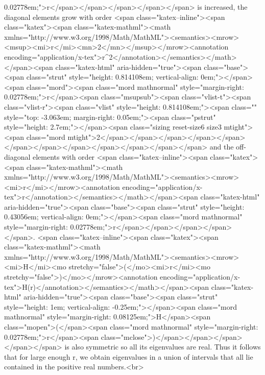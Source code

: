 0.02778em;">r</span></span></span></span></span> is increased, the diagonal elements grow with order <span class="katex--inline"><span class="katex"><span class="katex-mathml"><math xmlns="http://www.w3.org/1998/Math/MathML"><semantics><mrow><msup><mi>r</mi><mn>2</mn></msup></mrow><annotation encoding="application/x-tex">r^2</annotation></semantics></math></span><span class="katex-html" aria-hidden="true"><span class="base"><span class="strut" style="height: 0.814108em; vertical-align: 0em;"></span><span class="mord"><span class="mord mathnormal" style="margin-right: 0.02778em;">r</span><span class="msupsub"><span class="vlist-t"><span class="vlist-r"><span class="vlist" style="height: 0.814108em;"><span class="" style="top: -3.063em; margin-right: 0.05em;"><span class="pstrut" style="height: 2.7em;"></span><span class="sizing reset-size6 size3 mtight"><span class="mord mtight">2</span></span></span></span></span></span></span></span></span></span></span></span> and the off-diagonal elements with order <span class="katex--inline"><span class="katex"><span class="katex-mathml"><math xmlns="http://www.w3.org/1998/Math/MathML"><semantics><mrow><mi>r</mi></mrow><annotation encoding="application/x-tex">r</annotation></semantics></math></span><span class="katex-html" aria-hidden="true"><span class="base"><span class="strut" style="height: 0.43056em; vertical-align: 0em;"></span><span class="mord mathnormal" style="margin-right: 0.02778em;">r</span></span></span></span></span>. <span class="katex--inline"><span class="katex"><span class="katex-mathml"><math xmlns="http://www.w3.org/1998/Math/MathML"><semantics><mrow><mi>H</mi><mo stretchy="false">(</mo><mi>r</mi><mo stretchy="false">)</mo></mrow><annotation encoding="application/x-tex">H(r)</annotation></semantics></math></span><span class="katex-html" aria-hidden="true"><span class="base"><span class="strut" style="height: 1em; vertical-align: -0.25em;"></span><span class="mord mathnormal" style="margin-right: 0.08125em;">H</span><span class="mopen">(</span><span class="mord mathnormal" style="margin-right: 0.02778em;">r</span><span class="mclose">)</span></span></span></span></span> is also symmetric so all its eigenvalues are real. Thus it follows that for large enough r, we obtain eigenvalues in a union of intervals that all lie contained in the positive real numbers.<br>

